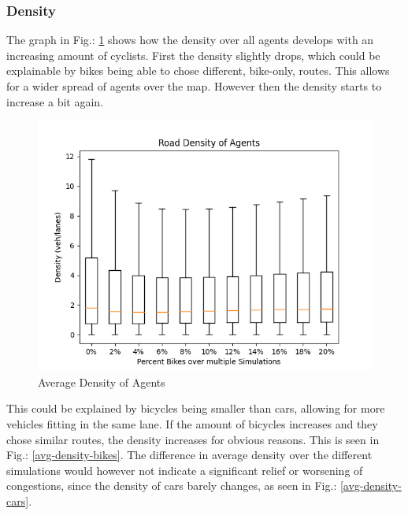 \subsubsection{Density}\label{density}
The graph in Fig.: \ref{avg-density-agents} shows how the density over all agents develops with an increasing amount of cyclists. First the density slightly drops, which could be explainable by bikes being able to chose different, bike-only, routes. This allows for a wider spread of agents over the map. However then the density starts to increase a bit again. 

\begin{figure}
  \centering
    \vspace{-0.6cm}
  \includegraphics[width=\linewidth]{./figures/road_density_agent.png}
  \caption{Average Density of Agents}\label{avg-density-agents}
\end{figure}
This could be explained by bicycles being smaller than cars, allowing for more vehicles fitting in the same lane. If the amount of bicycles increases and they chose similar routes, the density increases for obvious reasons. This is seen in Fig.: \ref{avg-density-bikes}. The difference in average density over the different simulations would however not indicate a significant relief or worsening of congestions, since the density of cars barely changes, as seen in Fig.: \ref{avg-density-cars}.
\vspace{-0.4cm}
